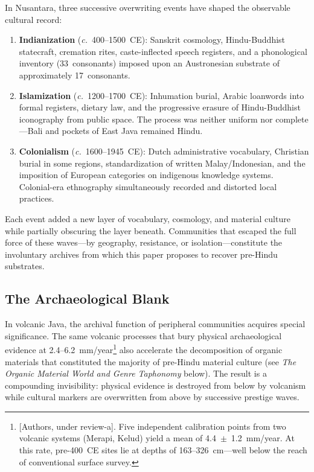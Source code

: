 \documentclass[12pt,a4paper]{article}
\begin{document}
In Nusantara, three successive overwriting events have shaped the observable cultural record:

\begin{enumerate}
\item \textbf{Indianization} (\textit{c.}~400--1500~CE): Sanskrit cosmology, Hindu-Buddhist statecraft, cremation rites, caste-inflected speech registers, and a phonological inventory (33~consonants) imposed upon an Austronesian substrate of approximately 17~consonants.

\item \textbf{Islamization} (\textit{c.}~1200--1700~CE): Inhumation burial, Arabic loanwords into formal registers, dietary law, and the progressive erasure of Hindu-Buddhist iconography from public space. The process was neither uniform nor complete---Bali and pockets of East Java remained Hindu.

\item \textbf{Colonialism} (\textit{c.}~1600--1945~CE): Dutch administrative vocabulary, Christian burial in some regions, standardization of written Malay/Indonesian, and the imposition of European categories on indigenous knowledge systems. Colonial-era ethnography simultaneously recorded and distorted local practices.
\end{enumerate}

Each event added a new layer of vocabulary, cosmology, and material culture while partially obscuring the layer beneath. Communities that escaped the full force of these waves---by geography, resistance, or isolation---constitute the involuntary archives from which this paper proposes to recover pre-Hindu substrates.

\subsection{The Archaeological Blank}

In volcanic Java, the archival function of peripheral communities acquires special significance. The same volcanic processes that bury physical archaeological evidence at 2.4--6.2~mm/year\footnote{[Authors, under review-a]. Five independent calibration points from two volcanic systems (Merapi, Kelud) yield a mean of 4.4~$\pm$~1.2~mm/year. At this rate, pre-400~CE sites lie at depths of 163--326~cm---well below the reach of conventional surface survey.} also accelerate the decomposition of organic materials that constituted the majority of pre-Hindu material culture (see \emph{The Organic Material World and Genre Taphonomy} below). The result is a compounding invisibility: physical evidence is destroyed from below by volcanism while cultural markers are overwritten from above by successive prestige waves.
\end{document}
